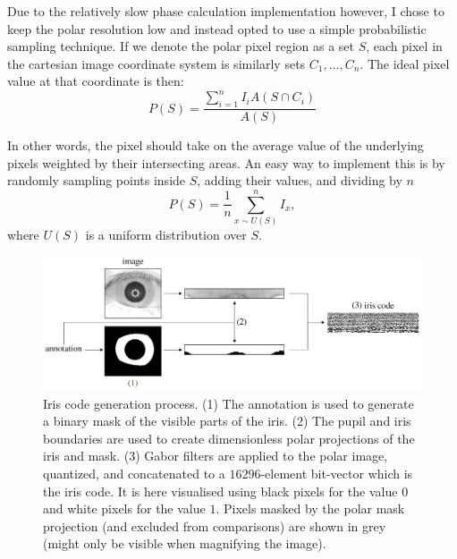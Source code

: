 Due to the relatively slow phase calculation implementation however, I chose to keep the polar resolution low and instead opted to use a simple probabilistic sampling technique. If we denote the polar pixel region as a set $S$, each pixel in the cartesian image coordinate system is similarly sets $C_1, \dots, C_n$. The ideal pixel value at that coordinate is then:
\begin{equation}
    P(S) = \frac{\sum_{i=1}^n I_i A(S\cap C_i)}{A(S)}
\end{equation}

In other words, the pixel should take on the average value of the underlying pixels weighted by their intersecting areas. An easy way to implement this is by randomly sampling points inside $S$, adding their values, and dividing by $n$
\begin{equation}
    P(S) = \frac{1}{n}\sum_{x \sim U(S)}^n I_{x},
\end{equation}
where $U(S)$ is a uniform distribution over $S$. 

\begin{figure}
    \centering
    \includegraphics[width=1\linewidth]{figures/iris-code-gen.pdf}
    \caption{Iris code generation process. (1) The annotation is used to generate a binary mask of the visible parts of the iris. (2) The pupil and iris boundaries are used to create dimensionless polar projections of the iris and mask. (3) Gabor filters are applied to the polar image, quantized, and concatenated to a $16296$-element bit-vector which is the iris code. It is here visualised using black pixels for the value $0$ and white pixels for the value $1$. Pixels masked by the polar mask projection (and excluded from comparisons) are shown in grey (might only be visible when magnifying the image). }
    \label{fig:iris-code-gen}
\end{figure}

